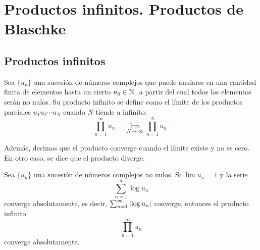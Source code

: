 \chapter{Productos infinitos. Productos de Blaschke}

\section{Productos infinitos}

\begin{definition}
    Sea $\{u_n\}$ una sucesión de números complejos que puede anularse en una cantidad finita de elementos hasta un cierto $n_0 \in \mathbb{N}$, a partir del cual todos los elementos serán no nulos. Su producto infinito se define como el límite de los productos parciales $u_1 u_2 \cdots u_N$ cuando $N$ tiende a infinito:
\begin{equation*}
    \prod_{n=1}^{\infty} u_n = \lim_{N \to \infty} \prod_{n=1}^{N} u_n.
\end{equation*}

Además, decimos que el producto converge cuando el límite existe y no es cero. En otro caso, se dice que el producto diverge. \\
\end{definition}


\begin{prop}
    Sea $\{u_n\}$ una sucesión de números complejos no nulos. Si $\lim u_n =1$ y la serie
    \begin{equation*}
        \sum_{n=1}^{\infty} \log u_n
    \end{equation*}
    converge absolutamente, es decir, $ \sum_{n=1}^{\infty} \left\lvert\log u_n\right\rvert$ converge, entonces el producto infinito
    \begin{equation*}
        \prod_{n=1}^{\infty} u_n
    \end{equation*}
    converge absolutamente.
\end{prop}


